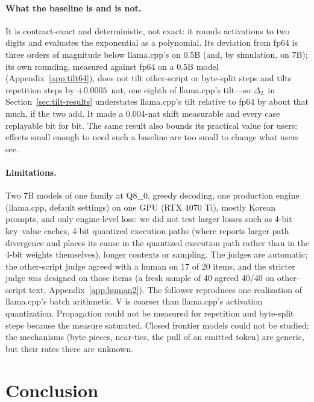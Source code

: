 \documentclass[11pt]{article}
\begin{document}
\paragraph{What the baseline is and is not.}
It is contract-exact and deterministic, not exact: it rounds activations to two digits and evaluates the exponential as a
polynomial. Its deviation from fp64 is three orders of magnitude below llama.cpp's on 0.5B (and, by simulation, on 7B);
its own rounding, measured against fp64 on a 0.5B model (Appendix~\ref{app:tilt64}), does not tilt other-script or byte-split
steps and tilts repetition steps by $+0.0005$~nat, one eighth of llama.cpp's tilt---so $\Delta_L$ in
Section~\ref{sec:tilt-results} understates llama.cpp's tilt relative to fp64 by about that much, if the two add. It made a
0.004-nat shift measurable and every case replayable bit for bit. The same result also bounds its practical value for users: effects small
enough to need such a baseline are too small to change what users see.

\paragraph{Limitations.}
Two 7B models of one family at Q8\_0, greedy decoding, one production engine (llama.cpp, default settings) on one GPU (RTX
4070 Ti), mostly Korean prompts, and only engine-level loss: we did not test larger losses such as 4-bit key--value caches,
4-bit quantized execution paths (where \citet{patodiya2026} reports larger path divergence and places its cause in the
quantized execution path rather than in the 4-bit weights themselves), longer contexts or sampling. The judges are automatic;
the other-script judge agreed with a human on 17 of 20 items, and the stricter judge was designed on those items (a fresh sample of 40
agreed 40/40 on other-script text, Appendix~\ref{app:human2}). The
follower reproduces one realization of llama.cpp's batch arithmetic. V is coarser than llama.cpp's activation quantization.
Propagation could not be measured for repetition and byte-split steps because the measure saturated. Closed frontier models
could not be studied; the mechanisms (byte pieces, near-ties, the pull of an emitted token) are generic, but their rates there
are unknown.

\section{Conclusion}\label{sec:conclusion}
\end{document}
